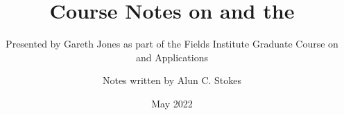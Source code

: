 \documentclass[graybox,envcountchap]{svmono}
\date{May 2022}
\begin{document}
\author{Notes written by Alun C. Stokes}
\title{Course Notes on \Omy and the \pwT}
\subtitle{Presented by Gareth Jones as part of the Fields Institute Graduate Course on \Omy and Applications}
\maketitle
\frontmatter%


%



\tableofcontents




\mainmatter%

  
  
  
  
  
  
  
%


  
  
  
  





\backmatter%

\printindex

\end{document}
